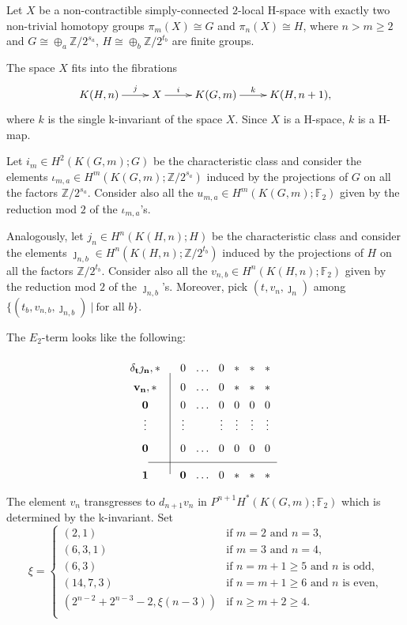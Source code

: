 \documentclass{amsart}
\theoremstyle{definition}
\theoremstyle{remark}
\newcommand{\Z}{\mathbb{Z}}
\newcommand{\F}{\mathbb{F}}
\renewcommand{\geq}{\geqslant}
\begin{document}
Let $X$ be a non-contractible simply-connected $2$-local H-space with exactly two non-trivial homotopy groups $\pi_m(X)\cong G$ and $\pi_n(X)\cong H$, where $n>m\geq2$ and $G\cong\oplus_a\Z/2^{s_a}$, $H\cong\oplus_b\Z/2^{t_b}$ are finite groups. 

\newpage
The space $X$ fits into the fibrations
$$\xymatrix{
K(H,n)\ar[r]^-j &X\ar[r]^-i &K(G,m)\ar[r]^-k &K(H,n+1),
}$$
where $k$ is the single k-invariant of the space $X$. Since $X$ is a H-space, $k$ is a H-map.


Let $i_m\in H^2(K(G,m);G)$ be the characteristic class and consider the elements $\iota_{m,a}\in H^m(K(G,m);\Z/2^{s_a})$ induced by the projections of $G$ on all the factors $\Z/2^{s_a}$. Consider also all the $u_{m,a}\in H^m(K(G,m);\F_2)$ given by the reduction mod $2$ of the $\iota_{m,a}$'s.

Analogously, let $j_n\in H^n(K(H,n);H)$ be the characteristic class and consider the elements $\jmath_{n,b}\in H^n(K(H,n);\Z/2^{t_b})$ induced by the projections of $H$ on all the factors $\Z/2^{t_b}$. Consider also all the $v_{n,b}\in H^n(K(H,n);\F_2)$ given by the reduction mod $2$ of the $\jmath_{n,b}$'s. Moreover, pick $(t,v_n,\jmath_n)$ among $\{(t_b,v_{n,b},\jmath_{n,b})\ |\ \text{for all $b$}\}$.

The $E_2$-term looks like the following:
$$\xymatrix@R=0.1cm@C=0.1cm{
&&\\
{\bf \delta_t\jmath_n,*}  &&0 &\dots &0 &{*} &{*} &{*}\\
{\bf v_n,*}  &&0 &\dots &0 &{*} &{*} &{*}\\
{\bf 0} &&0 &\dots &0 &0 &0 &0\\
{\bf \vdots} &&\vdots & &\vdots &\vdots &\vdots &\vdots\\
{\bf 0} &&0 &\dots &0 &0 &0 &0\\ \ar@{-}[rrrrrrrr] &&&&&&&&\\
{\bf 1} &\ar@{-}[uuuuuu] &{\bf 0} &{\dots} &{0} &{*} &{*} &{*}}
$$

The element $v_n$ transgresses to $d_{n+1}v_n$ in $P^{n+1}H^*(K(G,m);\F_2)$ which is determined by the k-invariant. Set 
$$
\xi=\begin{cases}
(2,1) &\text{if $m=2$ and $n=3$,}\\
(6,3,1) &\text{if $m=3$ and $n=4$,}\\
(6,3) &\text{if $n=m+1\geq5$ and $n$ is odd,}\\
(14,7,3) &\text{if $n=m+1\geq6$ and $n$ is even,}\\
(2^{n-2}+2^{n-3}-2,\xi(n-3)) &\text{if $n\geq m+2\geq4$.}\\
\end{cases}
$$
\end{document}
